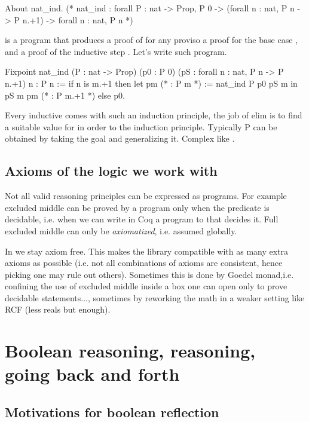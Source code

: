 \begin{coq}{}{}
About nat_ind.
(* nat_ind :
forall P : nat -> Prop, P 0 -> (forall n : nat, P n -> P n.+1) -> forall n : nat, P n *)
\end{coq}

 is a program that produces a proof of  for any 
proviso a proof for the base case , and a proof
of the inductive step .
Let's write such program.

\begin{coq}{}{}
Fixpoint nat_ind (P : nat -> Prop)
  (p0 : P 0) (pS : forall n : nat, P n -> P n.+1) n : P n :=
  if n is m.+1 then
    let pm (* : P m *) := nat_ind P p0 pS m in
    pS m pm (* : P m.+1 *)
  else p0.
\end{coq}

Every inductive comes with such an induction principle, the job of elim is
to find a suitable value for  in order to  the induction
principle. Typically P can be obtained by taking the goal and generalizing
it.  Complex  like .

\subsection{Axioms of the logic we work with}

Not all valid reasoning principles can be expressed as programs.
For example excluded middle can be proved by a program only when
the predicate is decidable, i.e. when we can write in Coq a program
to  that decides it.
Full excluded middle can only be \emph{axiomatized}, i.e. assumed globally.

In \mcbMC{} we stay axiom free.  This makes the library compatible with as many
extra axioms as possible (i.e. not all combinations of axioms are consistent,
hence picking one may rule out others).  Sometimes this is done by Goedel monad,i.e. confining the use of excluded middle inside a box one can open only to prove decidable statements..., sometimes by reworking the math in a weaker setting like RCF (less reals but enough).


\section{Boolean reasoning,  reasoning, going back and forth}



\subsection{Motivations for boolean reflection}

